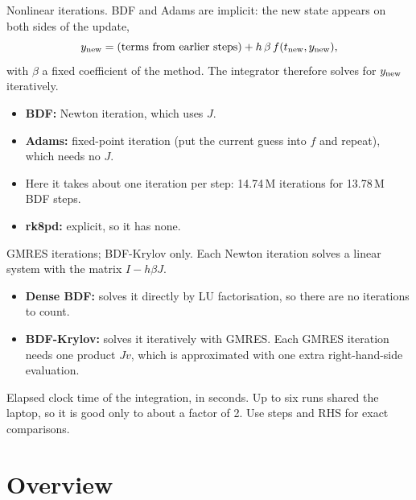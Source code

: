 \documentclass[10pt,a4paper]{article}
\begin{document}
\begin{description}[style=nextline,leftmargin=1.2cm,itemsep=3pt]
    \item[NL it.] Nonlinear iterations. BDF and Adams are implicit: the new state appears on both sides of the update,
        \[
            y_{\rm new} = (\text{terms from earlier steps}) + h\,\beta\, f(t_{\rm new}, y_{\rm new}),
        \]
        with $\beta$ a fixed coefficient of the method. The integrator therefore solves for $y_{\rm new}$ iteratively.
        \begin{itemize}
            \item \textbf{BDF:} Newton iteration, which uses $J$.
            \item \textbf{Adams:} fixed-point iteration (put the current guess into $f$ and repeat), which needs no $J$.
            \item Here it takes about one iteration per step: 14.74\,M iterations for 13.78\,M BDF steps.
            \item \textbf{rk8pd:} explicit, so it has none.
        \end{itemize}

    \item[lin. it.] GMRES iterations; BDF-Krylov only. Each Newton iteration solves a linear system with the matrix $I-h\beta J$.
        \begin{itemize}
            \item \textbf{Dense BDF:} solves it directly by LU factorisation, so there are no iterations to count.
            \item \textbf{BDF-Krylov:} solves it iteratively with GMRES. Each GMRES iteration needs one product $Jv$, which is approximated with one extra right-hand-side evaluation.
        \end{itemize}

    \item[wall {[s]}] Elapsed clock time of the integration, in seconds. Up to six runs shared the laptop, so it is good only to about a factor of 2. Use steps and RHS for exact comparisons.
\end{description}

\section{Overview}

\begin{table}[h]
    \centering\footnotesize
    \caption{The networks. Each name links to its page.}
    \label{tab:nets}
    
\end{table}
\end{document}
